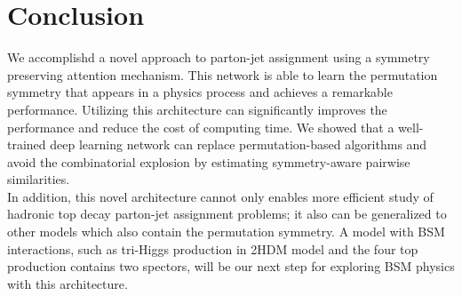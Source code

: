 \chapter{Conclusion}

We accomplishd a novel approach to parton-jet assignment using a symmetry preserving attention mechanism. This network is able to learn the permutation symmetry that appears in a physics process and achieves a remarkable performance. Utilizing this architecture can significantly improves the performance and reduce the cost of computing time. We showed that a well-trained deep learning network can replace permutation-based algorithms and avoid the combinatorial explosion by estimating symmetry-aware pairwise similarities.
\\
In addition, this novel architecture cannot only enables more efficient study of hadronic top decay parton-jet assignment problems; it also can be generalized to other models which also contain the permutation symmetry. A model with BSM interactions, such as tri-Higgs production in 2HDM model and the four top production contains two spectors, will be our next step for exploring BSM physics with this architecture.